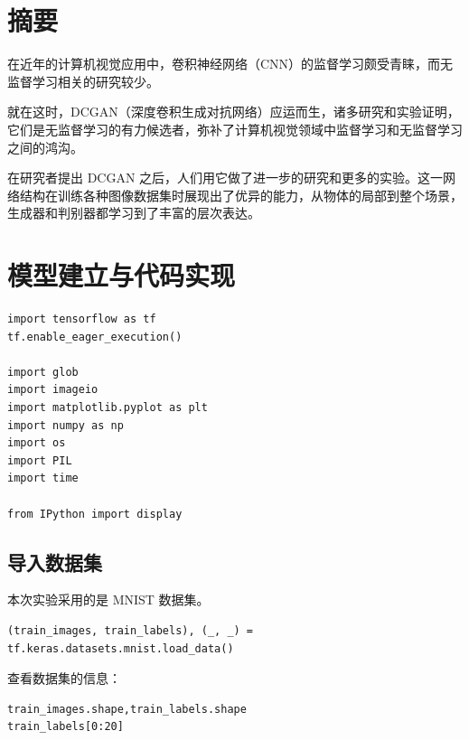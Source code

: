 \documentclass[a4paper, 12pt]{article}
\begin{document}





\section{摘要}
在近年的计算机视觉应用中，卷积神经网络（CNN）的监督学习颇受青睐，而无监督学习相关的研究较少。

就在这时，DCGAN（深度卷积生成对抗网络）应运而生，诸多研究和实验证明，它们是无监督学习的有力候选者，弥补了计算机视觉领域中监督学习和无监督学习之间的鸿沟。

在研究者提出 DCGAN 之后，人们用它做了进一步的研究和更多的实验。这一网络结构在训练各种图像数据集时展现出了优异的能力，从物体的局部到整个场景，生成器和判别器都学习到了丰富的层次表达。

\section{模型建立与代码实现}


\begin{lstlisting}[style=myPython,caption={导入必要的库}]
import tensorflow as tf
tf.enable_eager_execution()

import glob
import imageio
import matplotlib.pyplot as plt
import numpy as np
import os
import PIL
import time

from IPython import display
\end{lstlisting}

\subsection{导入数据集}
本次实验采用的是 MNIST 数据集。

\begin{lstlisting}[style=myPython,caption={导入数据集}]
(train_images, train_labels), (_, _) = tf.keras.datasets.mnist.load_data()
\end{lstlisting}

查看数据集的信息：

\begin{lstlisting}[style=myPython,caption={查看数据集信息}]
train_images.shape,train_labels.shape
train_labels[0:20]
\end{lstlisting}
\end{document}
